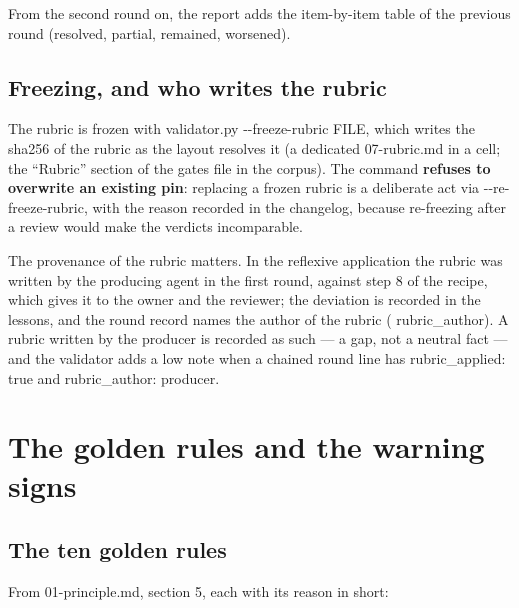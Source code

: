 \documentclass[
  american,
  10pt,
]{report}
\renewcommand{\texttt}[1]{{\ttfamily\hyphenchar\font=-1 #1}}
\begin{document}
From the second round on, the report adds the item-by-item table of the
previous round (resolved, partial, remained, worsened).

\section{Freezing, and who writes the
rubric}\label{freezing-and-who-writes-the-rubric}

The rubric is frozen with
\texttt{validator.\allowbreak{}py -\allowbreak{}-\allowbreak{}freeze-\allowbreak{}rubric FILE},
which writes the sha256 of the rubric as the layout resolves it (a
dedicated \texttt{07-\allowbreak{}rubric.\allowbreak{}md} in a cell; the
``Rubric'' section of the gates file in the corpus). The command
\textbf{refuses to overwrite an existing pin}: replacing a frozen rubric
is a deliberate act via
\texttt{-\allowbreak{}-\allowbreak{}re-\allowbreak{}freeze-\allowbreak{}rubric},
with the reason recorded in the changelog, because re-freezing after a
review would make the verdicts incomparable.

The provenance of the rubric matters. In the reflexive application the
rubric was written by the producing agent in the first round, against
step 8 of the recipe, which gives it to the owner and the reviewer; the
deviation is recorded in the lessons, and the round record names the
author of the rubric (\texttt{rubric\_\allowbreak{}author}). A rubric
written by the producer is recorded as such --- a gap, not a neutral
fact --- and the validator adds a low note when a chained round line has
\texttt{rubric\_\allowbreak{}applied:\allowbreak{} true} and
\texttt{rubric\_\allowbreak{}author:\allowbreak{} producer}.

\chapter{The golden rules and the warning
signs}\label{the-golden-rules-and-the-warning-signs}

\section{The ten golden rules}\label{the-ten-golden-rules}

From \texttt{01-\allowbreak{}principle.\allowbreak{}md}, section 5, each
with its reason in short:
\end{document}
